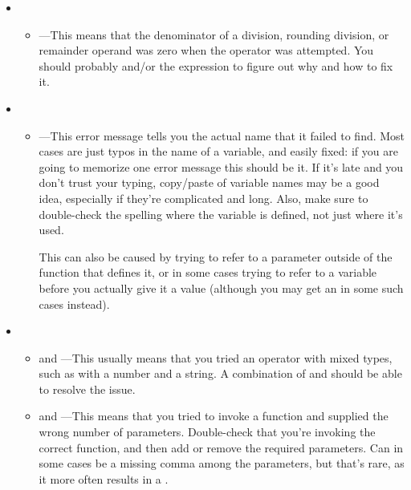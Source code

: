 \documentclass{handout}
\begin{document}
\begin{itemize}
\item {}

\begin{itemize}
  \item {}---This means that the denominator of a division, rounding division, or remainder operand was zero when the operator was attempted. You should probably  and/or  the expression to figure out why and how to fix it.
\end{itemize}

\item {}

\begin{itemize}
  \item {}---This error message tells you the actual name that it failed to find. Most cases are just typos in the name of a variable, and easily fixed: if you are going to memorize one error message this should be it. If it's late and you don't trust your typing, copy/paste of variable names may be a good idea, especially if they're complicated and long. Also, make sure to double-check the spelling where the variable is defined, not just where it's used.

  This can also be caused by trying to refer to a parameter outside of the function that defines it, or in some cases trying to refer to a variable before you actually give it a value (although you may get an  in some such cases instead).
\end{itemize}

\item {}

\begin{itemize}
  \item {} and ---This usually means that you tried an operator with mixed types, such as \code{+} with a number and a string. A combination of  and  should be able to resolve the issue.
  \item {} and ---This means that you tried to invoke a function and supplied the wrong number of parameters. Double-check that you're invoking the correct function, and then add or remove the required parameters. Can in some cases be a missing comma among the parameters, but that's rare, as it more often results in a .
  

\end{itemize}
\end{itemize}
\end{document}
